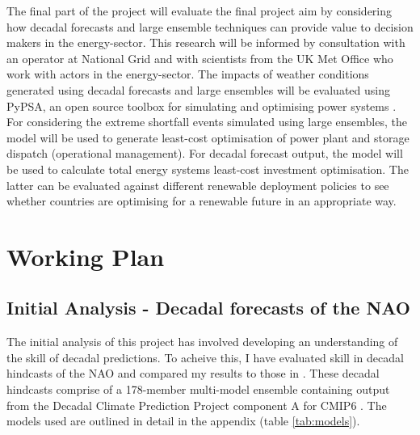 \documentclass{article}
\begin{document}
The final part of the project will evaluate the final project aim by considering how decadal forecasts and large ensemble techniques can provide value to decision makers in the energy-sector. This research will be informed by consultation with an operator at National Grid and with scientists from the UK Met Office who work with actors in the energy-sector. The impacts of weather conditions generated using decadal forecasts and large ensembles will be evaluated using PyPSA, an open source toolbox for simulating and optimising power systems \parencite{PyPSA}. For considering the extreme shortfall events simulated using large ensembles, the model will be used to generate least-cost optimisation of power plant and storage dispatch (operational management). For decadal forecast output, the model will be used to calculate total energy systems least-cost investment optimisation. The latter can be evaluated against different renewable deployment policies to see whether countries are optimising for a renewable future in an appropriate way.


\section*{Working Plan}

\subsection*{Initial Analysis - Decadal forecasts of the NAO}

The initial analysis of this project has involved developing an understanding of the skill of decadal predictions. To acheive this, I have evaluated skill in decadal hindcasts of the NAO and compared my results to those in \cite{smith2020north,marcheggiani2023decadal}. These decadal hindcasts comprise of a 178-member multi-model ensemble containing output from the Decadal Climate Prediction Project component A for CMIP6 \parencite{boer2016decadal}. The models used are outlined in detail in the appendix (table \ref{tab:models}).\\
\end{document}
